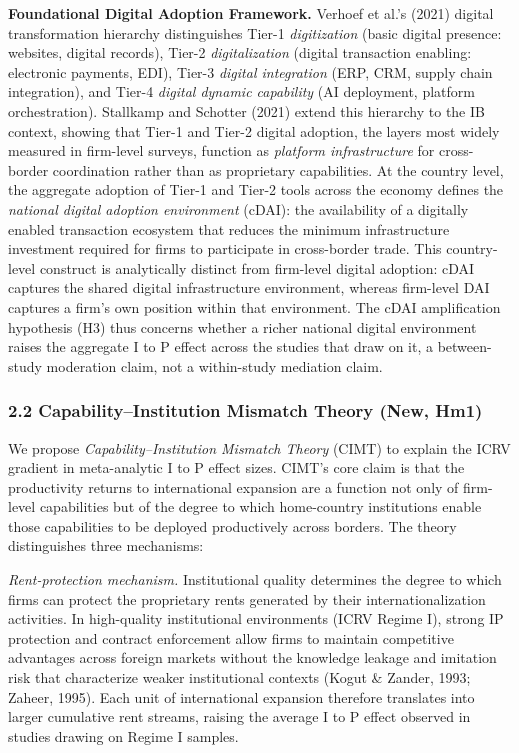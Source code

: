 \documentclass[
  12pt,a4paper]{article}
\begin{document}
\textbf{Foundational Digital Adoption Framework.} Verhoef et al.'s
(2021) digital transformation hierarchy distinguishes Tier-1
\emph{digitization} (basic digital presence: websites, digital records),
Tier-2 \emph{digitalization} (digital transaction enabling: electronic
payments, EDI), Tier-3 \emph{digital integration} (ERP, CRM, supply
chain integration), and Tier-4 \emph{digital dynamic capability} (AI
deployment, platform orchestration). Stallkamp and Schotter (2021)
extend this hierarchy to the IB context, showing that Tier-1 and Tier-2
digital adoption, the layers most widely measured in firm-level surveys,
function as \emph{platform infrastructure} for cross-border coordination
rather than as proprietary capabilities. At the country level, the
aggregate adoption of Tier-1 and Tier-2 tools across the economy defines
the \emph{national digital adoption environment} (cDAI): the
availability of a digitally enabled transaction ecosystem that reduces
the minimum infrastructure investment required for firms to participate
in cross-border trade. This country-level construct is analytically
distinct from firm-level digital adoption: cDAI captures the shared
digital infrastructure environment, whereas firm-level DAI captures a
firm's own position within that environment. The cDAI amplification
hypothesis (H3) thus concerns whether a richer national digital
environment raises the aggregate I to P effect across the studies that
draw on it, a between-study moderation claim, not a within-study
mediation claim.

\hypertarget{capabilityinstitution-mismatch-theory-new-hm1}{%
\subsubsection{2.2 Capability--Institution Mismatch Theory (New,
Hm1)}\label{capabilityinstitution-mismatch-theory-new-hm1}}

We propose \emph{Capability--Institution Mismatch Theory} (CIMT) to
explain the ICRV gradient in meta-analytic I to P effect sizes. CIMT's
core claim is that the productivity returns to international expansion
are a function not only of firm-level capabilities but of the degree to
which home-country institutions enable those capabilities to be deployed
productively across borders. The theory distinguishes three mechanisms:

\emph{Rent-protection mechanism.} Institutional quality determines the
degree to which firms can protect the proprietary rents generated by
their internationalization activities. In high-quality institutional
environments (ICRV Regime I), strong IP protection and contract
enforcement allow firms to maintain competitive advantages across
foreign markets without the knowledge leakage and imitation risk that
characterize weaker institutional contexts (Kogut \& Zander, 1993;
Zaheer, 1995). Each unit of international expansion therefore translates
into larger cumulative rent streams, raising the average I to P effect
observed in studies drawing on Regime I samples.
\end{document}
